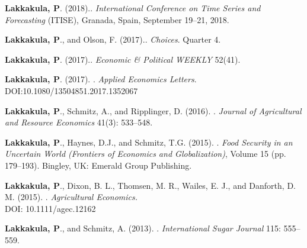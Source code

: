 \documentclass[margin,line]{res}
\begin{document}
\begin{resume}
\begin{etaremune}
\item {\bf Lakkakula, P}. (2018).\href{https://drive.google.com/file/d/1tGgLDFsG0a1c6tacnu3UusQmmJSwS5bK/view}{}. {\em International Conference on Time Series and Forecasting} (ITISE), Granada, Spain, September 19--21, 2018.
\item {\bf Lakkakula, P}., and Olson, F. (2017).\href{http://www.choicesmagazine.org/choices-magazine/submitted-articles/sweeteners-may-leave-a-sour-note-on-nafta-renegotiations}{}. {\em Choices}. Quarter 4.
\item {\bf Lakkakula, P}. (2017).\href{http://www.epw.in/engage/article/what-are-effects-gst-indian-agriculture-case-turmeric}{}. {\em Economic \& Political WEEKLY} 52(41).
\item {\bf Lakkakula, P}. (2017). \href{http://www.tandfonline.com/doi/full/10.1080/13504851.2017.1352067}{}. {\em Applied Economics Letters}. DOI:10.1080/13504851.2017.1352067
\item {\bf Lakkakula, P}., Schmitz, A., and Ripplinger, D. (2016). \href{http://www.waeaonline.org/UserFiles/file/JARESeptember201611Lakkakula533-548.pdf}{}. {\em Journal of Agricultural and Resource Economics} 41(3): 533--548.
\item {\bf Lakkakula, P}., Haynes, D.J., and Schmitz, T.G. (2015). \href{http://www.emeraldinsight.com/doi/pdfplus/10.1108/S1574-871520150000015020}{}. \textit{Food Security in an Uncertain World (Frontiers of Economics and Globalization)}, Volume 15 (pp. 179--193). Bingley, UK: Emerald Group Publishing.
\item {\bf Lakkakula, P}., Dixon, B. L., Thomsen, M. R., Wailes, E. J., and Danforth, D. M. (2015). \href{http://onlinelibrary.wiley.com/doi/10.1111/agec.12162/abstract}{}. {\em Agricultural Economics.} \\ DOI: 10.1111/agec.12162 
\item {\bf Lakkakula, P}., and Schmitz, A. (2013). \href{https://www.internationalsugarjournal.com/paper/sugar-and-high-fructose-corn-syrup-consumption-shifts-change-in-tastes-or-relative-prices/}{}. {\em International Sugar Journal} 115: 555--559. 
\end{etaremune}


\end{resume}
\end{document}
